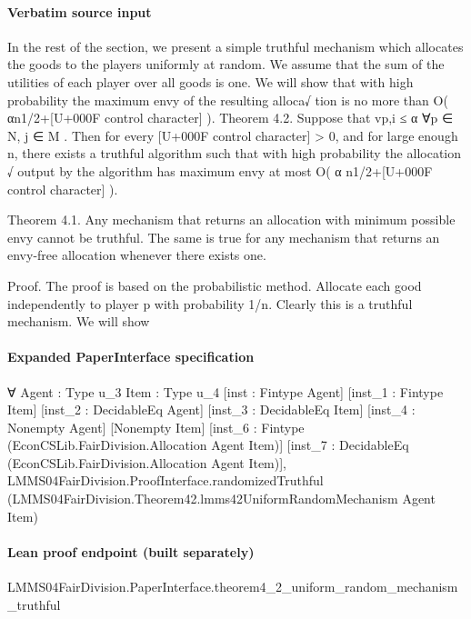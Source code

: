 \documentclass[10pt]{article}
\begin{document}
\paragraph{Verbatim source input}
\begin{ReviewVerbatim}
In the rest of the section, we present a simple truthful
mechanism which allocates the goods to the players uniformly at random. We assume that the sum of the utilities
of each player over all goods is one. We will show that with
high probability the maximum
envy of the resulting alloca√
tion is no more than O( αn1/2+[U+000F control character] ).
Theorem 4.2. Suppose that vp,i ≤ α ∀p ∈ N, j ∈ M .
Then for every [U+000F control character] > 0, and for large enough n, there exists
a truthful algorithm such that with high probability the allocation
√ output by the algorithm has maximum envy at most
O( α n1/2+[U+000F control character] ).

Theorem 4.1. Any mechanism that returns an allocation
with minimum possible envy cannot be truthful. The same is
true for any mechanism that returns an envy-free allocation
whenever there exists one.

Proof. The proof is based on the probabilistic method.
Allocate each good independently to player p with probability 1/n. Clearly this is a truthful mechanism. We will show
\end{ReviewVerbatim}


\paragraph{Expanded PaperInterface specification}
\begin{ReviewVerbatim}
∀ {Agent : Type u_3} {Item : Type u_4} [inst : Fintype Agent] [inst_1 : Fintype Item] [inst_2 : DecidableEq Agent]
  [inst_3 : DecidableEq Item] [inst_4 : Nonempty Agent] [Nonempty Item]
  [inst_6 : Fintype (EconCSLib.FairDivision.Allocation Agent Item)]
  [inst_7 : DecidableEq (EconCSLib.FairDivision.Allocation Agent Item)],
  LMMS04FairDivision.ProofInterface.randomizedTruthful
    (LMMS04FairDivision.Theorem42.lmms42UniformRandomMechanism Agent Item)
\end{ReviewVerbatim}

\paragraph{Lean proof endpoint (built separately)}\begin{ReviewVerbatim}
LMMS04FairDivision.PaperInterface.theorem4_2_uniform_random_mechanism_truthful
\end{ReviewVerbatim}
\end{document}
